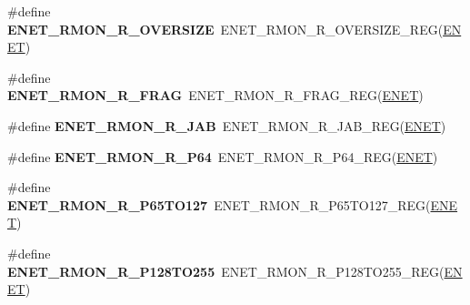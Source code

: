 \begin{DoxyCompactItemize}
\item 
\#define {\bfseries E\+N\+E\+T\+\_\+\+R\+M\+O\+N\+\_\+\+R\+\_\+\+O\+V\+E\+R\+S\+I\+ZE}~E\+N\+E\+T\+\_\+\+R\+M\+O\+N\+\_\+\+R\+\_\+\+O\+V\+E\+R\+S\+I\+Z\+E\+\_\+\+R\+EG(\hyperlink{group__ENET__Peripheral__Access__Layer_ga4745105f505f3ab949d6a57fbe2a0ed5}{E\+N\+ET})\hypertarget{group__ENET__Register__Accessor__Macros_ga0b81baf39415b445c3454ff4edd8ec4d}{}\label{group__ENET__Register__Accessor__Macros_ga0b81baf39415b445c3454ff4edd8ec4d}

\item 
\#define {\bfseries E\+N\+E\+T\+\_\+\+R\+M\+O\+N\+\_\+\+R\+\_\+\+F\+R\+AG}~E\+N\+E\+T\+\_\+\+R\+M\+O\+N\+\_\+\+R\+\_\+\+F\+R\+A\+G\+\_\+\+R\+EG(\hyperlink{group__ENET__Peripheral__Access__Layer_ga4745105f505f3ab949d6a57fbe2a0ed5}{E\+N\+ET})\hypertarget{group__ENET__Register__Accessor__Macros_gad0856e86288f36006ca6d4adc2a2547a}{}\label{group__ENET__Register__Accessor__Macros_gad0856e86288f36006ca6d4adc2a2547a}

\item 
\#define {\bfseries E\+N\+E\+T\+\_\+\+R\+M\+O\+N\+\_\+\+R\+\_\+\+J\+AB}~E\+N\+E\+T\+\_\+\+R\+M\+O\+N\+\_\+\+R\+\_\+\+J\+A\+B\+\_\+\+R\+EG(\hyperlink{group__ENET__Peripheral__Access__Layer_ga4745105f505f3ab949d6a57fbe2a0ed5}{E\+N\+ET})\hypertarget{group__ENET__Register__Accessor__Macros_gac89cfeeea3d6804f8e5e5ec467472b7e}{}\label{group__ENET__Register__Accessor__Macros_gac89cfeeea3d6804f8e5e5ec467472b7e}

\item 
\#define {\bfseries E\+N\+E\+T\+\_\+\+R\+M\+O\+N\+\_\+\+R\+\_\+\+P64}~E\+N\+E\+T\+\_\+\+R\+M\+O\+N\+\_\+\+R\+\_\+\+P64\+\_\+\+R\+EG(\hyperlink{group__ENET__Peripheral__Access__Layer_ga4745105f505f3ab949d6a57fbe2a0ed5}{E\+N\+ET})\hypertarget{group__ENET__Register__Accessor__Macros_ga358714bb5af0b88fa0754074684960f1}{}\label{group__ENET__Register__Accessor__Macros_ga358714bb5af0b88fa0754074684960f1}

\item 
\#define {\bfseries E\+N\+E\+T\+\_\+\+R\+M\+O\+N\+\_\+\+R\+\_\+\+P65\+T\+O127}~E\+N\+E\+T\+\_\+\+R\+M\+O\+N\+\_\+\+R\+\_\+\+P65\+T\+O127\+\_\+\+R\+EG(\hyperlink{group__ENET__Peripheral__Access__Layer_ga4745105f505f3ab949d6a57fbe2a0ed5}{E\+N\+ET})\hypertarget{group__ENET__Register__Accessor__Macros_ga3a41b9ac512a20e1a99638ef76b9f2fa}{}\label{group__ENET__Register__Accessor__Macros_ga3a41b9ac512a20e1a99638ef76b9f2fa}

\item 
\#define {\bfseries E\+N\+E\+T\+\_\+\+R\+M\+O\+N\+\_\+\+R\+\_\+\+P128\+T\+O255}~E\+N\+E\+T\+\_\+\+R\+M\+O\+N\+\_\+\+R\+\_\+\+P128\+T\+O255\+\_\+\+R\+EG(\hyperlink{group__ENET__Peripheral__Access__Layer_ga4745105f505f3ab949d6a57fbe2a0ed5}{E\+N\+ET})\hypertarget{group__ENET__Register__Accessor__Macros_gaaef2afce7e061100f21ed17b33452abe}{}\label{group__ENET__Register__Accessor__Macros_gaaef2afce7e061100f21ed17b33452abe}


\end{DoxyCompactItemize}
